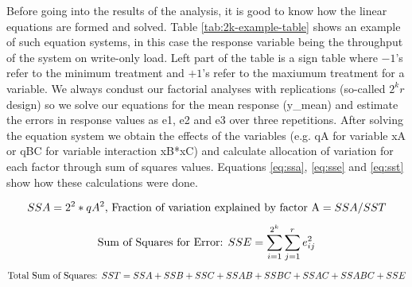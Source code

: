 \documentclass[11pt,a4paper]{article}
\begin{document}
\par Before going into the results of the analysis, it is good to know how the linear equations are formed and solved. Table \ref{tab:2k-example-table} shows an example of such equation systems, in this case the response variable being the throughput of the system on write-only load. Left part of the table is a sign table where $-1$'s refer to the minimum treatment and $+1$'s refer to the maxiumum treatment for a variable. We always condust our factorial analyses with replications (so-called $2^{k}r$ design) so we solve our equations for the mean response (y\_mean) and estimate the errors in response values as e1, e2 and e3 over three repetitions. After solving the equation system we obtain the effects of the variables (e.g. qA for variable xA or qBC for variable interaction xB*xC) and calculate allocation of variation for each factor through sum of squares values. Equations \ref{eq:ssa}, \ref{eq:sse} and \ref{eq:sst} show how these calculations were done.
\begin{small}
\begin{equation} \label{eq:ssa}
SSA = 2^2*qA^2 \textnormal{, Fraction of variation explained by factor A} = SSA / SST
\end{equation}
\begin{equation} \label{eq:sse}
\textnormal{Sum of Squares for Error: } SSE = \sum_{i=1}^{2^{k}}\sum_{j=1}^{r} e_{ij}^{2}
\end{equation}
\begin{equation} \label{eq:sst}
\textnormal{Total Sum of Squares: } SST = SSA + SSB + SSC + SSAB + SSBC + SSAC + SSABC + SSE
\end{equation}
\end{small}
\end{document}
